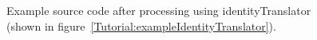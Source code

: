 \begin{figure}[!h]
{\indent
{\mySmallFontSize


\begin{latexonly}
   
\end{latexonly}

\begin{htmlonly}
   
\end{htmlonly}

}
}
\caption{Example source code after processing using identityTranslator 
(shown in figure~\ref{Tutorial:exampleIdentityTranslator}).}
\label{Tutorial:exampleTemplate1}
\end{figure}



